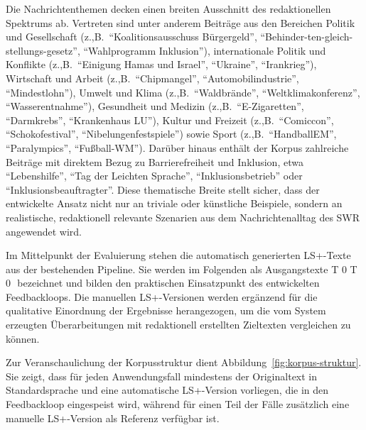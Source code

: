 Die Nachrichtenthemen decken einen breiten Ausschnitt des redaktionellen Spektrums ab. Vertreten sind unter anderem Beiträge aus den Bereichen Politik und Gesellschaft (z.,B.\ \enquote{Koalitionsausschuss Bürgergeld}, \enquote{Behinder-ten-gleich-stellungs-gesetz}, \enquote{Wahlprogramm Inklusion}), internationale Politik und Konflikte (z.,B.\ \enquote{Einigung Hamas und Israel}, \enquote{Ukraine}, \enquote{Irankrieg}), Wirtschaft und Arbeit (z.,B.\ \enquote{Chipmangel}, \enquote{Automobilindustrie}, \enquote{Mindestlohn}), Umwelt und Klima (z.,B.\ \enquote{Waldbrände}, \enquote{Weltklimakonferenz}, \enquote{Wasserentnahme}), Gesundheit und Medizin (z.,B.\ \enquote{E-Zigaretten}, \enquote{Darmkrebs}, \enquote{Krankenhaus LU}), Kultur und Freizeit (z.,B.\ \enquote{Comiccon}, \enquote{Schokofestival}, \enquote{Nibelungenfestspiele}) sowie Sport (z.,B.\ \enquote{HandballEM}, \enquote{Paralympics}, \enquote{Fußball-WM}). Darüber hinaus enthält der Korpus zahlreiche Beiträge mit direktem Bezug zu Barrierefreiheit und Inklusion, etwa \enquote{Lebenshilfe}, \enquote{Tag der Leichten Sprache}, \enquote{Inklusionsbetrieb} oder \enquote{Inklusionsbeauftragter}. Diese thematische Breite stellt sicher, dass der entwickelte Ansatz nicht nur an triviale oder künstliche Beispiele, sondern an realistische, redaktionell relevante Szenarien aus dem Nachrichtenalltag des SWR angewendet wird.

Im Mittelpunkt der Evaluierung stehen die automatisch generierten LS+-Texte aus der bestehenden Pipeline. Sie werden im Folgenden als Ausgangstexte 
T
0
T 
0
​
bezeichnet und bilden den praktischen Einsatzpunkt des entwickelten Feedbackloops. Die manuellen LS+-Versionen werden ergänzend für die qualitative Einordnung der Ergebnisse herangezogen, um die vom System erzeugten Überarbeitungen mit redaktionell erstellten Zieltexten vergleichen zu können.

Zur Veranschaulichung der Korpusstruktur dient Abbildung~\ref{fig:korpus-struktur}. Sie zeigt, dass für jeden Anwendungsfall mindestens der Originaltext in Standardsprache und eine automatische LS+-Version vorliegen, die in den Feedbackloop eingespeist wird, während für einen Teil der Fälle zusätzlich eine manuelle LS+-Version als Referenz verfügbar ist.


